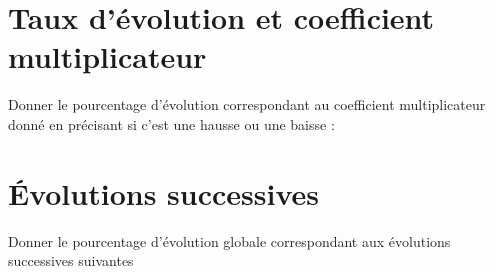 
\section{Taux d'évolution et coefficient multiplicateur}

\begin{questions}

	\question[3] Donner le pourcentage d'évolution correspondant au coefficient multiplicateur donné en précisant si c'est une hausse ou une baisse :
	
\end{questions}


\section{\'Evolutions successives}

\begin{questions}
	
	
	\question[3] Donner le pourcentage d'évolution globale correspondant aux évolutions successives suivantes
	
\end{questions}


